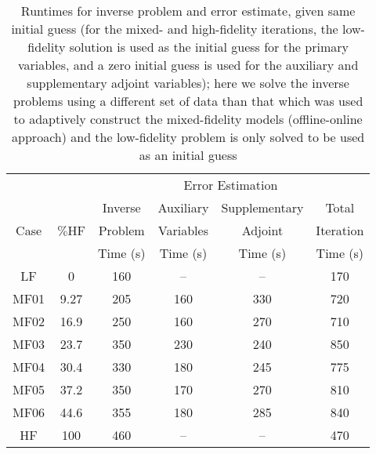 \begin{table}
\caption{Runtimes for inverse problem and error estimate, given same initial guess (for the mixed- and high-fidelity iterations, the low-fidelity solution is used as the initial guess for the primary variables, and a zero initial guess is used for the auxiliary and supplementary adjoint variables); here we solve the inverse problems using a different set of data than that which was used to adaptively construct the mixed-fidelity models (offline-online approach) and the low-fidelity problem is only solved to be used as an initial guess}
\label{tab:ref3D_dainty_timebreak_sameinit_newdata}
\centering
\begin{tabular}{ccc|c|c|c}
\cline{4-5} 
 & & & \multicolumn{2}{|c|}{Error Estimation} & \\
\cline{1-6}
\multicolumn{1}{|c|}{\multirow{3}{*}{Case}} & \multicolumn{1}{|c|}{\multirow{3}{*}{$\%$HF}} & Inverse & Auxiliary & Supplementary & \multicolumn{1}{|c|}{Total} \\
\multicolumn{1}{|c|}{} & \multicolumn{1}{|c|}{} & Problem & Variables & Adjoint & \multicolumn{1}{|c|}{Iteration}\\
\multicolumn{1}{|c|}{} & \multicolumn{1}{|c|}{} & Time (s) &  Time (s) & Time (s) & \multicolumn{1}{|c|}{Time (s)}\\
\cline{1-6}
\multicolumn{1}{|c|}{LF}    & \multicolumn{1}{|c|}{0}     & 160 & -- & -- & \multicolumn{1}{|c|}{170} \\ \hline
\multicolumn{1}{|c|}{MF01}  & \multicolumn{1}{|c|}{9.27}  & 205 & 160 & 330 & \multicolumn{1}{|c|}{720} \\ \hline
\multicolumn{1}{|c|}{MF02}  & \multicolumn{1}{|c|}{16.9}  & 250 & 160 & 270 & \multicolumn{1}{|c|}{710} \\ \hline
\multicolumn{1}{|c|}{MF03}  & \multicolumn{1}{|c|}{23.7}  & 350 & 230 & 240 & \multicolumn{1}{|c|}{850} \\ \hline
\multicolumn{1}{|c|}{MF04}  & \multicolumn{1}{|c|}{30.4}  & 330 & 180 & 245 & \multicolumn{1}{|c|}{775} \\ \hline
\multicolumn{1}{|c|}{MF05}  & \multicolumn{1}{|c|}{37.2}  & 350 & 170 & 270 & \multicolumn{1}{|c|}{810} \\ \hline
\multicolumn{1}{|c|}{MF06}  & \multicolumn{1}{|c|}{44.6}  & 355 & 180 & 285 & \multicolumn{1}{|c|}{840} \\ \hline
\multicolumn{1}{|c|}{HF}    & \multicolumn{1}{|c|}{100}   & 460 & -- & -- & \multicolumn{1}{|c|}{470} \\ \hline
\end{tabular}
\end{table}
